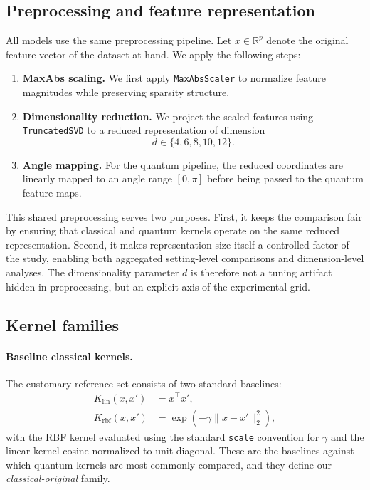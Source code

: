 \documentclass[journal]{IEEEtran}
\begin{document}
\subsection{Preprocessing and feature representation}

All models use the same preprocessing pipeline. Let $x \in \mathbb{R}^p$ denote the original feature vector of the dataset at hand. We apply the following steps:

\begin{enumerate}
    \item \textbf{MaxAbs scaling.} We first apply \texttt{MaxAbsScaler} to normalize feature magnitudes while preserving sparsity structure.
    \item \textbf{Dimensionality reduction.} We project the scaled features using \texttt{TruncatedSVD} to a reduced representation of dimension
    \[
    d \in \{4,6,8,10,12\}.
    \]
    \item \textbf{Angle mapping.} For the quantum pipeline, the reduced coordinates are linearly mapped to an angle range $[0,\pi]$ before being passed to the quantum feature maps.
\end{enumerate}

This shared preprocessing serves two purposes. First, it keeps the comparison fair by ensuring that classical and quantum kernels operate on the same reduced representation. Second, it makes representation size itself a controlled factor of the study, enabling both aggregated setting-level comparisons and dimension-level analyses. The dimensionality parameter $d$ is therefore not a tuning artifact hidden in preprocessing, but an explicit axis of the experimental grid.

\subsection{Kernel families}

\paragraph{Baseline classical kernels.}
The customary reference set consists of two standard baselines:
\begin{align}
K_{\mathrm{lin}}(x,x') &= x^\top x',\\
K_{\mathrm{rbf}}(x,x') &= \exp\left(-\gamma\|x-x'\|_2^2\right),
\end{align}
with the RBF kernel evaluated using the standard \texttt{scale} convention for $\gamma$ and the linear kernel cosine-normalized to unit diagonal. These are the baselines against which quantum kernels are most commonly compared, and they define our \emph{classical-original} family.
\end{document}
